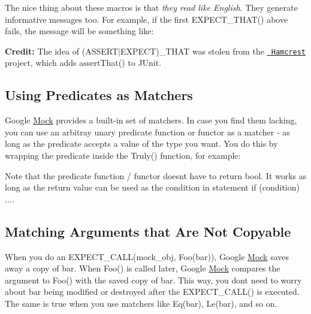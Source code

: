 The nice thing about these macros is that {\itshape they read like English}. They generate informative messages too. For example, if the first {\ttfamily E\+X\+P\+E\+C\+T\+\_\+\+T\+H\+A\+T()} above fails, the message will be something like\+:


\begin{DoxyCode}{0}
\end{DoxyCode}


{\bfseries{Credit\+:}} The idea of {\ttfamily (A\+S\+S\+E\+R\+T$\vert$\+E\+X\+P\+E\+CT)\+\_\+\+T\+H\+AT} was stolen from the \href{http://code.google.com/p/hamcrest/}\texttt{ Hamcrest} project, which adds {\ttfamily assert\+That()} to J\+Unit.

\subsection*{Using Predicates as Matchers}

Google \mbox{\hyperlink{class_mock}{Mock}} provides a built-\/in set of matchers. In case you find them lacking, you can use an arbitray unary predicate function or functor as a matcher -\/ as long as the predicate accepts a value of the type you want. You do this by wrapping the predicate inside the {\ttfamily Truly()} function, for example\+:


\begin{DoxyCode}{0}
\DoxyCodeLine{}
\DoxyCodeLine{}
\end{DoxyCode}


Note that the predicate function / functor doesn\textquotesingle{}t have to return {\ttfamily bool}. It works as long as the return value can be used as the condition in statement {\ttfamily if (condition) ...}.

\subsection*{Matching Arguments that Are Not Copyable}

When you do an {\ttfamily E\+X\+P\+E\+C\+T\+\_\+\+C\+A\+L\+L(mock\+\_\+obj, Foo(bar))}, Google \mbox{\hyperlink{class_mock}{Mock}} saves away a copy of {\ttfamily bar}. When {\ttfamily Foo()} is called later, Google \mbox{\hyperlink{class_mock}{Mock}} compares the argument to {\ttfamily Foo()} with the saved copy of {\ttfamily bar}. This way, you don\textquotesingle{}t need to worry about {\ttfamily bar} being modified or destroyed after the {\ttfamily E\+X\+P\+E\+C\+T\+\_\+\+C\+A\+L\+L()} is executed. The same is true when you use matchers like {\ttfamily Eq(bar)}, {\ttfamily Le(bar)}, and so on.

